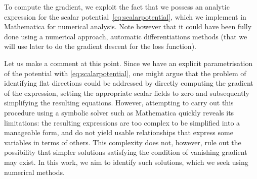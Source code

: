 \documentclass[11pt,a4paper]{article}
\begin{document}
To compute the gradient, we exploit the fact that we possess an analytic expression for the scalar potential~\eqref{eq:scalarpotential}, which we implement in Mathematica for numerical analysis. Note however that it could have been fully done using a numerical approach, automatic differentiations methods (that we will use later to do the gradient descent for the loss function).

Let us make a comment at this point. Since we have an explicit parametrisation of the potential with \eqref{eq:scalarpotential}, one might argue that the problem of identifying flat directions could be addressed by directly computing the gradient of the expression, setting the appropriate scalar fields to zero and subsequently simplifying the resulting equations. However, attempting to carry out this procedure using a symbolic solver such as Mathematica quickly reveals its limitations: the resulting expressions are too complex to be simplified into a manageable form, and do not yield usable relationships that express some variables in terms of others. This complexity does not, however, rule out the possibility that simpler solutions satisfying the condition of vanishing gradient may exist. In this work, we aim to identify such solutions, which we seek using numerical methods. 
\end{document}
